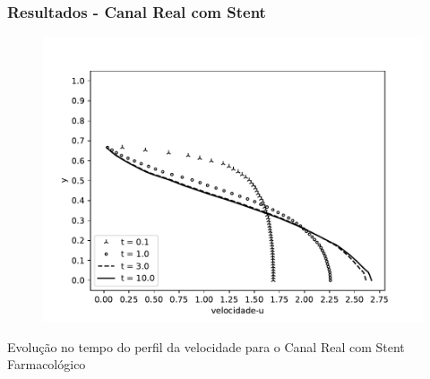 \begin{frame}
 \frametitle{\Large Resultados - Canal Real com Stent}
\begin{figure}
  \centering
  \vspace{-1.5cm}
  \includegraphics[scale=0.59]{images/vel_RealStrut_evol.pdf}\\
\end{figure}
\vspace{-0.2cm}
\centering \scriptsize Evolução no tempo do perfil da velocidade para o Canal Real com Stent Farmacológico
\end{frame}


